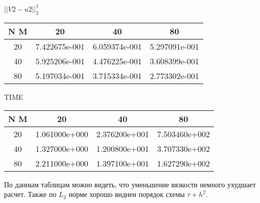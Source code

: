 \begin{center}
	$||V2 - u2||_{2}^1$
	\begin{tabular}{|c|c|c|c|}
		\hline 
		N  M& 20& 40& 80\\ 
		\hline 
		20 & 7.422675e-001 & 6.059374e-001 & 5.297091e-001 \\ \hline 
		40 & 5.925206e-001 & 4.476225e-001 & 3.608399e-001 \\ \hline 
		80 & 5.197034e-001 & 3.715334e-001 & 2.773302e-001 \\ \hline 
		\hline 
	\end{tabular} 
\end{center} 
\begin{center}
	TIME
	\begin{tabular}{|c|c|c|c|}
		\hline 
		N  M& 20& 40& 80\\ 
		\hline 
		20 & 1.061000e+000 & 2.376200e+001 & 7.503460e+002 \\ \hline 
		40 & 1.327000e+000 & 1.200800e+001 & 3.707330e+002 \\ \hline 
		80 & 2.211000e+000 & 1.397100e+001 & 1.627290e+002 \\ \hline 
		\hline 
	\end{tabular} 
\end{center} 

По данным таблицам можно видеть, что уменьшение вязкости немного ухудшает расчет.
Также по $L_2$ норме хорошо виднен порядок схемы $\tau + h^2$.
